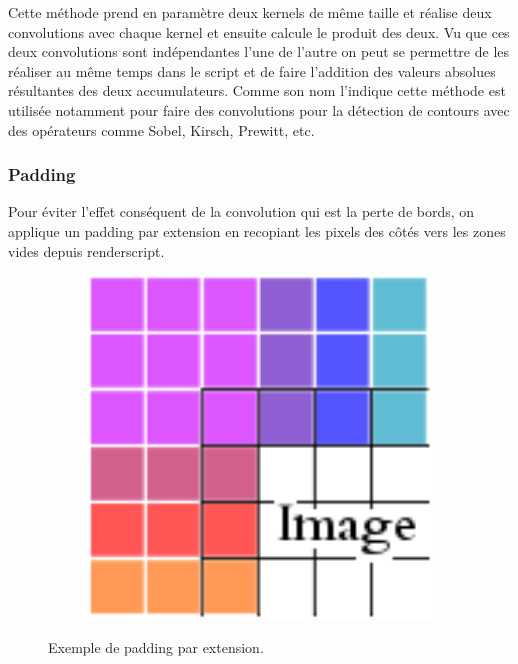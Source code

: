         Cette méthode prend en paramètre deux kernels de même taille et réalise deux convolutions avec chaque kernel et ensuite calcule le produit des deux.
        Vu que ces deux convolutions sont indépendantes l'une de l'autre on peut se permettre de les réaliser au même temps dans le script et de faire l'addition
        des valeurs absolues résultantes des deux accumulateurs. Comme son nom l'indique cette méthode est utilisée notamment pour faire des convolutions pour la détection de contours
        avec des opérateurs comme Sobel, Kirsch, Prewitt, etc.
    \\
        

    \subsubsection*{Padding} \label{padding}

        Pour éviter l'effet conséquent de la convolution qui est la perte de bords, on applique un padding par extension en recopiant les pixels des côtés vers les zones vides depuis renderscript.
        \begin{figure}[!h]
            \centering
            \begin{subfigure}[b]{0.3\textwidth}
                \includegraphics[width=1\textwidth]{report_src/effects/padding.png}
            \end{subfigure}
            \caption*{Exemple de padding par extension.}
        \end{figure} 



